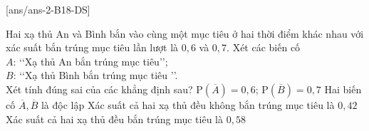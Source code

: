 \cauds
{}[ans/ans-2-B18-DS]
\begin{ex}%
	Hai xạ thủ An và Bình bắn vào cùng một mục tiêu ở hai thời điểm khác nhau với xác suất bắn trúng mục tiêu lần lượt là $0{,}6$ và $0{,}7$. Xét các biến cố\\ 
	$A$: \lq\lq Xạ thủ An bắn trúng mục tiêu\rq\rq;\\
	$B$: \lq\lq Xạ thủ Bình bắn trúng mục tiêu \rq\rq.\\
	Xét tính đúng sai của các khẳng định sau?
	\choiceTF
	{$\mathrm{P}(\overline{A})=0{,}6$;  $\mathrm{P}(\overline{B})=0{,}7$}
	{\True Hai biến cố $\overline{A}, \overline{B}$ là độc lập}
	{Xác suất cả hai xạ thủ đều không bắn trúng mục tiêu là $0{,}42$}
	{Xác suất cả hai xạ thủ đều bắn trúng mục tiêu là $0{,}58$}
\end{ex}

